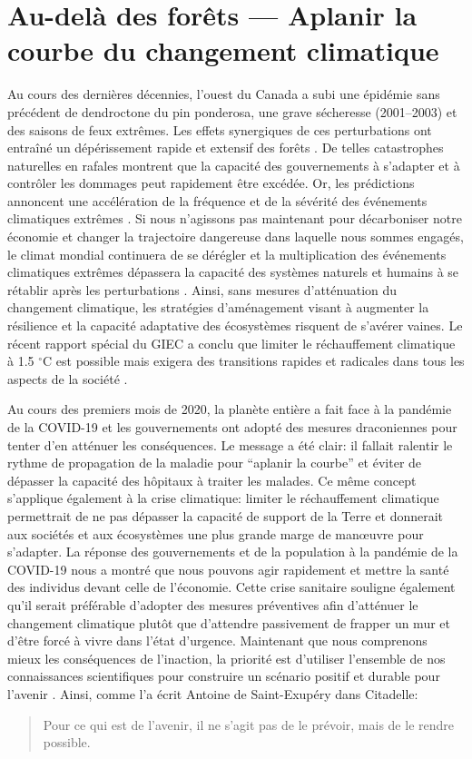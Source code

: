 \hypertarget{au-deluxe0-des-foruxeats-aplanir-la-courbe-du-changement-climatique}{%
\section{Au-delà des forêts --- Aplanir la courbe du changement
climatique}\label{au-deluxe0-des-foruxeats-aplanir-la-courbe-du-changement-climatique}}

Au cours des dernières décennies, l'ouest du Canada a subi une épidémie
sans précédent de dendroctone du pin ponderosa, une grave sécheresse
(2001--2003) et des saisons de feux extrêmes. Les effets synergiques de
ces perturbations ont entraîné un dépérissement rapide et extensif des
forêts \citep{williamson_climate_2009}. De telles catastrophes
naturelles en rafales montrent que la capacité des gouvernements à
s'adapter et à contrôler les dommages peut rapidement être excédée. Or,
les prédictions annoncent une accélération de la fréquence et de la
sévérité des événements climatiques extrêmes \citep{ipcc_climate_2014}.
Si nous n'agissons pas maintenant pour décarboniser notre économie et
changer la trajectoire dangereuse dans laquelle nous sommes engagés, le
climat mondial continuera de se dérégler et la multiplication des
événements climatiques extrêmes dépassera la capacité des systèmes
naturels et humains à se rétablir après les perturbations
\citep{ipcc_summary_2018}. Ainsi, sans mesures d'atténuation du
changement climatique, les stratégies d'aménagement visant à augmenter
la résilience et la capacité adaptative des écosystèmes risquent de
s'avérer vaines. Le récent rapport spécial du GIEC a conclu que limiter
le réchauffement climatique à 1.5 \(^{\circ}\)C est possible mais
exigera des transitions rapides et radicales dans tous les aspects de la
société \citep{ipcc_summary_2018}.

Au cours des premiers mois de 2020, la planète entière a fait face à la
pandémie de la COVID-19 et les gouvernements ont adopté des mesures
draconiennes pour tenter d'en atténuer les conséquences. Le message a
été clair: il fallait ralentir le rythme de propagation de la maladie
pour ``aplanir la courbe'' et éviter de dépasser la capacité des
hôpitaux à traiter les malades. Ce même concept s'applique également à
la crise climatique: limiter le réchauffement climatique permettrait de
ne pas dépasser la capacité de support de la Terre et donnerait aux
sociétés et aux écosystèmes une plus grande marge de man\oe{}uvre pour
s'adapter. La réponse des gouvernements et de la population à la
pandémie de la COVID-19 nous a montré que nous pouvons agir rapidement
et mettre la santé des individus devant celle de l'économie. Cette crise
sanitaire souligne également qu'il serait préférable d'adopter des
mesures préventives afin d'atténuer le changement climatique plutôt que
d'attendre passivement de frapper un mur et d'être forcé à vivre dans
l'état d'urgence. Maintenant que nous comprenons mieux les conséquences
de l'inaction, la priorité est d'utiliser l'ensemble de nos
connaissances scientifiques pour construire un scénario positif et
durable pour l'avenir \citep{bennett_bright_2016}. Ainsi, comme l'a
écrit Antoine de Saint-Exupéry
\citeyearpar{saint-exupery_citadelle_1948} dans Citadelle:

\begin{quote}
Pour ce qui est de l'avenir, il ne s'agit pas de le prévoir, mais de le
rendre possible.
\end{quote}
